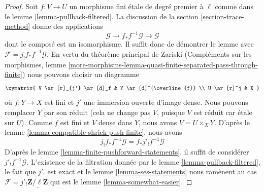 \begin{proof}
Soit $f : V \to U$ un morphisme fini étale de degré premier à $\ell$
comme dans le lemme \ref{lemma-pullback-filtered}. La discussion de la
section \ref{section-trace-method} donne des applications
$$
\mathcal{G} \to f_*f^{-1}\mathcal{G} \to \mathcal{G}
$$
dont le composé est un isomorphisme. Il suffit donc de démontrer le
lemme avec $\mathcal{F} = j_!f_*f^{-1}\mathcal{G}$.
En vertu du théorème principal de Zariski
(Compléments sur les morphismes, lemme
\ref{more-morphisms-lemma-quasi-finite-separated-pass-through-finite})
nous pouvons choisir un diagramme
$$
\xymatrix{
V \ar[r]_{j'} \ar[d]_f & Y \ar[d]^{\overline{f}} \\
U \ar[r]^j & X
}
$$
où $\overline{f} : Y \to X$ est fini et $j'$ une immersion ouverte
d'image dense. Nous pouvons remplacer $Y$ par son réduit (cela ne
change pas $V$, puisque $V$ est réduit car étale sur $U$).
Comme $f$ est fini et $V$ dense dans $Y$, nous avons $V = U \times_X Y$. D'après le
lemme \ref{lemma-compatible-shriek-push-finite}, nous avons
$$
j_!f_*f^{-1}\mathcal{G} = \overline{f}_*j'_!f^{-1}\mathcal{G}
$$
D'après le lemme \ref{lemma-finite-pushforward-statements}, il suffit de
considérer $j'_!f^{-1}\mathcal{G}$.
L'existence de la filtration donnée par le
lemme \ref{lemma-pullback-filtered},
le fait que $j'_!$ est exact et le
lemme \ref{lemma-ses-statements}
nous ramènent au cas
$\mathcal{F} = j'_!\underline{\mathbf{Z}/\ell\mathbf{Z}}$
qui est le lemme \ref{lemma-somewhat-easier}.
\end{proof}



